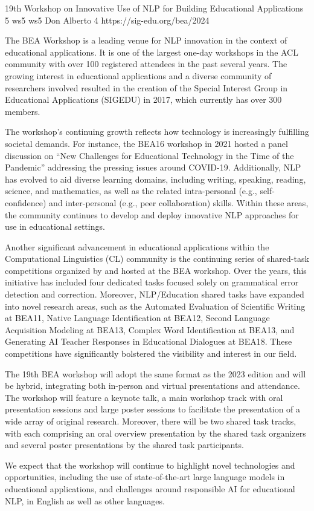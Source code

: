 \begin{wsschedulenolist}
{19th Workshop on Innovative Use of NLP for Building Educational Applications}
{5}
{ws5}
{ws5}
{Don Alberto 4}
{https://sig-edu.org/bea/2024}

The BEA Workshop is a leading venue for NLP innovation in the context of educational applications. It is one of the largest one-day workshops in the ACL community with over 100 registered attendees in the past several years. The growing interest in educational applications and a diverse community of researchers involved resulted in the creation of the Special Interest Group in Educational Applications (SIGEDU) in 2017, which currently has over 300 members.

The workshop's continuing growth reflects how technology is increasingly fulfilling societal demands. For instance, the BEA16 workshop in 2021 hosted a panel discussion on ``New Challenges for Educational Technology in the Time of the Pandemic'' addressing the pressing issues around COVID-19. Additionally, NLP has evolved to aid diverse learning domains, including writing, speaking, reading, science, and mathematics, as well as the related intra-personal (e.g., self-confidence) and inter-personal (e.g., peer collaboration) skills. Within these areas, the community continues to develop and deploy innovative NLP approaches for use in educational settings.

Another significant advancement in educational applications within the Computational Linguistics (CL) community is the continuing series of shared-task competitions organized by and hosted at the BEA workshop. Over the years, this initiative has included four dedicated tasks focused solely on grammatical error detection and correction. Moreover, NLP/Education shared tasks have expanded into novel research areas, such as the Automated Evaluation of Scientific Writing at BEA11, Native Language Identification at BEA12, Second Language Acquisition Modeling at BEA13, Complex Word Identification at BEA13, and Generating AI Teacher Responses in Educational Dialogues at BEA18. These competitions have significantly bolstered the visibility and interest in our field.

The 19th BEA workshop will adopt the same format as the 2023 edition and will be hybrid, integrating both in-person and virtual presentations and attendance. The workshop will feature a keynote talk, a main workshop track with oral presentation sessions and large poster sessions to facilitate the presentation of a wide array of original research. Moreover, there will be two shared task tracks, with each comprising an oral overview presentation by the shared task organizers and several poster presentations by the shared task participants.

We expect that the workshop will continue to highlight novel technologies and opportunities, including the use of state-of-the-art large language models in educational applications, and challenges around responsible AI for educational NLP, in English as well as other languages.

\end{wsschedulenolist}

